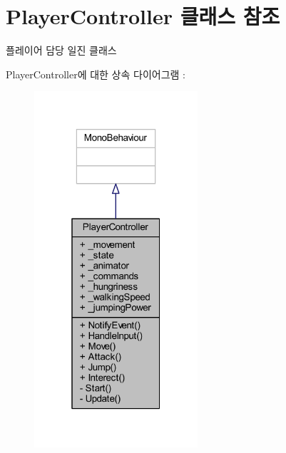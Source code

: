 \hypertarget{class_player_controller}{}\section{Player\+Controller 클래스 참조}
\label{class_player_controller}


플레이어 담당 일진 클래스  




Player\+Controller에 대한 상속 다이어그램 \+: 
\nopagebreak
\begin{figure}[H]
\begin{center}
\leavevmode
\includegraphics[width=172pt]{d1/dc2/class_player_controller__inherit__graph}
\end{center}
\end{figure}


